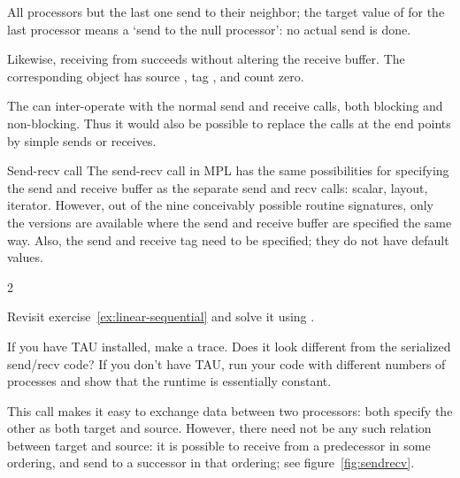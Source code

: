 All processors but the last one send to their neighbor; the target
value of  for
the last processor means a `send to the null processor': no actual
send is done. 

Likewise, receiving from  succeeds without
altering the receive buffer.  The corresponding
 object has source
, tag , and
count zero.

\begin{remark}
  The  can inter-operate with
  the normal send and receive calls, both blocking and non-blocking.
  Thus it would also be possible to replace the 
  calls at the end points by simple sends or receives.
\end{remark}

\begin{mplnote}{Send-recv call}
  The send-recv call in \ac{MPL} has the same possibilities
  for specifying the send and receive buffer as the separate send and recv calls:
  scalar, layout, iterator. However, out of the nine conceivably possible
  routine signatures, only the versions are available where the send and receive buffer
  are specified the same way.
  Also, the send and receive tag need to be specified; they do not have default values.

  \begin{multicols}{2}
    \columnbreak
  \end{multicols}
\end{mplnote}

\begin{exercise}
  \label{ex:rightsendrecv}
  Revisit exercise~\ref{ex:linear-sequential} and solve it using
  .

  If you have TAU installed, make a trace. Does it look different
  from the serialized send/recv code? If you don't have TAU, run your
  code with different numbers of processes and show that the runtime
  is essentially constant.
\end{exercise}

This call makes it easy to exchange data between two processors: both
specify the other as both target and source. However, there need not
be any such relation between target and source: it is possible to
receive from a predecessor in some ordering, and send to a successor
in that ordering; see figure~\ref{fig:sendrecv}.

